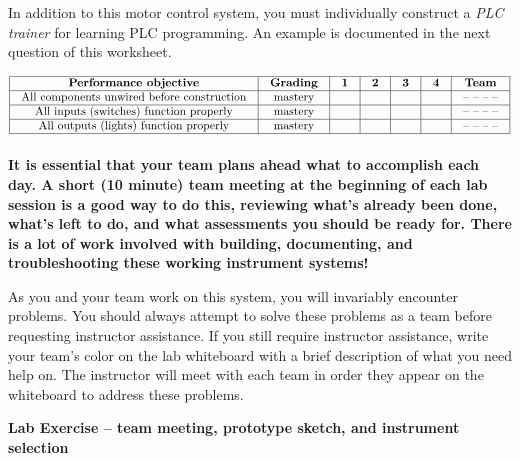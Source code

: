 \vskip 10pt

In addition to this motor control system, you must individually construct a {\it PLC trainer} for learning PLC programming.  An example is documented in the next question of this worksheet.



$$\vbox{\offinterlineskip
\halign{\strut
\vrule \quad\hfil # \ \hfil & 
\vrule \quad\hfil # \ \hfil & 
\vrule \quad\hfil # \ \hfil & 
\vrule \quad\hfil # \ \hfil & 
\vrule \quad\hfil # \ \hfil & 
\vrule \quad\hfil # \ \hfil & 
\vrule \quad\hfil # \ \hfil \vrule \cr
\noalign{\hrule}
%
{\bf Performance objective} & {\bf Grading} & {\bf 1} & {\bf 2} & {\bf 3} & {\bf 4} & {\bf Team} \cr
%
\noalign{\hrule}
%
All components unwired before construction & mastery & & & & & -- -- -- -- \cr
%
\noalign{\hrule}
%
All inputs (switches) function properly & mastery & & & & & -- -- -- -- \cr
%
\noalign{\hrule}
%
All outputs (lights) function properly & mastery & & & & & -- -- -- -- \cr
%
\noalign{\hrule}
} %
}$$ %

{\bf It is essential that your team plans ahead what to accomplish each day.  A short (10 minute) team meeting at the beginning of each lab session is a good way to do this, reviewing what's already been done, what's left to do, and what assessments you should be ready for.  There is a lot of work involved with building, documenting, and troubleshooting these working instrument systems!}

As you and your team work on this system, you will invariably encounter problems.  You should always attempt to solve these problems as a team before requesting instructor assistance.  If you still require instructor assistance, write your team's color on the lab whiteboard with a brief description of what you need help on.  The instructor will meet with each team in order they appear on the whiteboard to address these problems.




\vfil \eject







\noindent
{\bf Lab Exercise -- team meeting, prototype sketch, and instrument selection}

